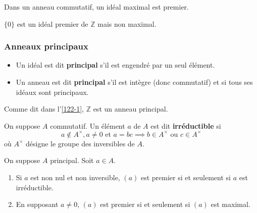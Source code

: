   \begin{corollary}
    Dans un anneau commutatif, un idéal maximal est premier.
  \end{corollary}

  \begin{cexample}
    $\{ 0 \}$ est un idéal premier de $\mathbb{Z}$ mais non maximal.
  \end{cexample}

  \subsubsection{Anneaux principaux}


  \begin{definition}
    \begin{itemize}
      \item Un idéal est dit \textbf{principal} s'il est engendré par un seul élément.
      \item Un anneau est dit \textbf{principal} s'il est intègre (donc commutatif) et si tous ses idéaux sont principaux.
    \end{itemize}
  \end{definition}

  \begin{example}
    Comme dit dans l'\cref{122-1}, $\mathbb{Z}$ est un anneau principal.
  \end{example}


  \begin{definition}
    On suppose $A$ commutatif. Un élément $a$ de $A$ est dit \textbf{irréductible} si
    \[ a \notin A^\times, a \neq 0 \text{ et } a = bc \implies b \in A^\times \text{ ou } c \in A^\times \]
    où $A^\times$ désigne le groupe des inversibles de $A$.
  \end{definition}

  \begin{theorem}
    On suppose $A$ principal. Soit $a \in A$.
    \begin{enumerate}[label={\bfseries(\roman*)}]
      \item Si $a$ est non nul et non inversible, $(a)$ est premier si et seulement si $a$ est irréductible.
      \item En supposant $a \neq 0$, $(a)$ est premier si et seulement si $(a)$ est maximal.
    \end{enumerate}
  \end{theorem}

